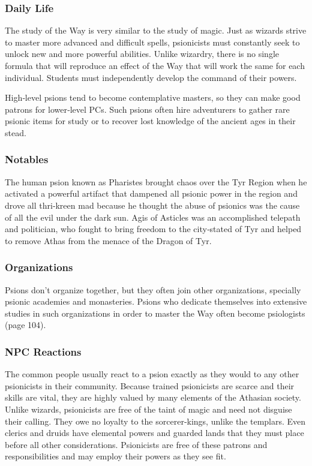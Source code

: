 \subsubsection{Daily Life}

The study of the Way is very similar to the study of magic. Just as wizards strive to master more advanced and difficult spells, psionicists must constantly seek to unlock new and more powerful abilities. Unlike wizardry, there is no single formula that will reproduce an effect of the Way that will work the same for each individual. Students must independently develop the command of their powers.

High‐level psions tend to become contemplative masters, so they can make good patrons for lower‐level PCs. Such psions often hire adventurers to gather rare psionic items for study or to recover lost knowledge of the ancient ages in their stead.

\subsubsection{Notables}

The human psion known as Pharistes brought chaos over the Tyr Region when he activated a powerful artifact that dampened all psionic power in the region and drove all thri‐kreen mad because he thought the abuse of psionics was the cause of all the evil under the dark sun. Agis of Asticles was an accomplished telepath and politician, who fought to bring freedom to the city‐stated of Tyr and helped to remove Athas from the menace of the Dragon of Tyr.

\subsubsection{Organizations}

Psions don't organize together, but they often join other organizations, specially psionic academies and monasteries. Psions who dedicate themselves into extensive studies in such organizations in order to master the Way often become psiologists (page 104).

\subsubsection{NPC Reactions}

The common people usually react to a psion exactly as they would to any other psionicists in their community. Because trained psionicists are scarce and their skills are vital, they are highly valued by many elements of the Athasian society. Unlike wizards, psionicists are free of the taint of magic and need not disguise their calling. They owe no loyalty to the sorcerer‐kings, unlike the templars. Even clerics and druids have elemental powers and guarded lands that they must place before all other considerations. Psionicists are free of these patrons and responsibilities and may employ their powers as they see fit.

